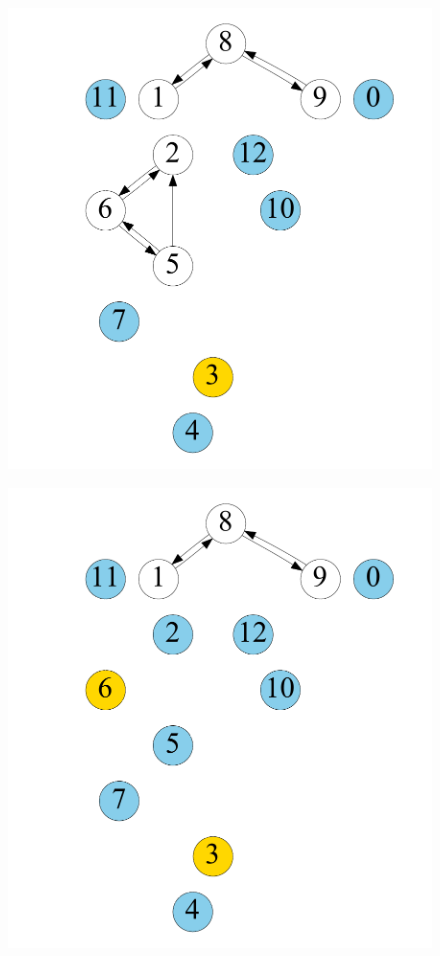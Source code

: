 \begin{figure}[t]
\begin{minipage}[b]{0.19\linewidth}
	\end{minipage}
	\begin{minipage}[b]{0.19\linewidth}
		\centering
		{\includegraphics[width=\textwidth]{./alg_fig/scc-g3}}
	\end{minipage}
	\begin{minipage}[b]{0.19\linewidth}
		\centering
		{\includegraphics[width=\textwidth]{./alg_fig/scc-g5}}

\end{minipage}
\end{figure}
